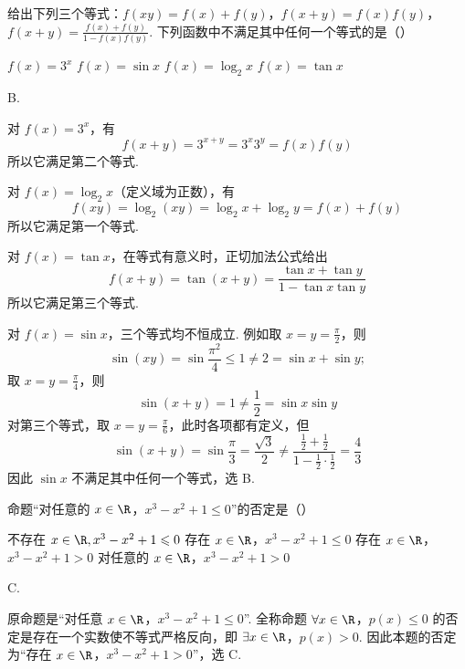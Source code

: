 \begin{problem}
给出下列三个等式：\(f(xy) = f(x) + f(y)\)，\(f(x + y) = f(x)f(y)\)，\(f(x + y) = \frac{f(x) + f(y)}{1 - f(x)f(y)}\). 下列函数中不满足其中任何一个等式的是（\quad）

\choices
    {\(f(x) = 3^{x}\)}
    {\(f(x) = \sin x\)}
    {\(f(x) = \log_2x\)}
    {\(f(x) = \tan x\)}
\end{problem}

\begin{answer}
B.
\end{answer}

\begin{solution}
对 \(f(x)=3^x\)，有
\[
f(x+y)=3^{x+y}=3^x3^y=f(x)f(y)
\]
所以它满足第二个等式.

对 \(f(x)=\log_2x\)（定义域为正数），有
\[
f(xy)=\log_2(xy)=\log_2x+\log_2y=f(x)+f(y)
\]
所以它满足第一个等式.

对 \(f(x)=\tan x\)，在等式有意义时，正切加法公式给出
\[
f(x+y)=\tan(x+y)=\frac{\tan x+\tan y}{1-\tan x\tan y}
\]
所以它满足第三个等式.

对 \(f(x)=\sin x\)，三个等式均不恒成立. 例如取 \(x=y=\frac{\pi}{2}\)，则
\[
\sin(xy)=\sin\frac{\pi^2}{4}\leqslant1\neq2=\sin x+\sin y;
\]
取 \(x=y=\frac{\pi}{4}\)，则
\[
\sin(x+y)=1\neq\frac12=\sin x\sin y
\]
对第三个等式，取 \(x=y=\frac{\pi}{6}\)，此时各项都有定义，但
\[
\sin(x+y)=\sin\frac{\pi}{3}=\frac{\sqrt3}{2}
\neq\frac{\frac12+\frac12}{1-\frac12\cdot\frac12}
=\frac43
\]
因此 \(\sin x\) 不满足其中任何一个等式，选 B.
\end{solution}

\begin{problem}
命题“对任意的 \(x \in \R\)，\(x^3 - x^2 + 1 \leqslant 0\)”的否定是（\quad）

\choices
    {不存在 \(x \in \R, x^3 - x^2 + 1 \leqslant 0\)}
    {存在 \(x \in \R\)，\(x^3 - x^2 + 1 \leqslant 0\)}
    {存在 \(x \in \R\)，\(x^3 - x^2 + 1 > 0\)}
    {对任意的 \(x \in \R\)，\(x^3 - x^2 + 1 > 0\)}
\end{problem}

\begin{answer}
C.
\end{answer}

\begin{solution}
原命题是“对任意 \(x\in\R\)，\(x^3-x^2+1\leqslant0\)”. 全称命题
\(\forall x\in\R\)，\(p(x)\leqslant0\)
的否定是存在一个实数使不等式严格反向，即
\(\exists x\in\R\)，\(p(x)>0\).
因此本题的否定为“存在 \(x\in\R\)，\(x^3-x^2+1>0\)”，选 C.
\end{solution}

